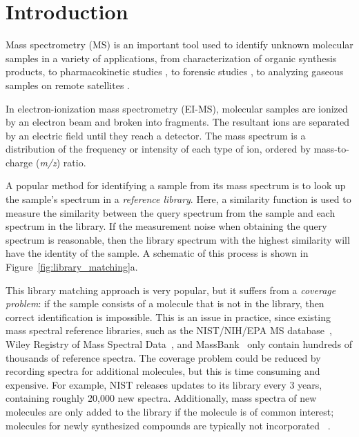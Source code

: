 \section{Introduction}

Mass spectrometry (MS) is an important tool used to identify unknown molecular samples in a variety of applications, from characterization of organic synthesis products, to pharmacokinetic studies \cite{massspec_pharmakinetics}, to forensic studies \cite{Zhou2017LatentFingerprints}, to analyzing gaseous samples on remote satellites \cite{Petrie_ions_in_space}.

In electron-ionization mass spectrometry (EI-MS), molecular samples are ionized by an electron beam and broken into fragments. The resultant ions are separated by an electric field until they reach a detector. The mass spectrum is a distribution of the frequency or intensity of each type of ion, ordered by mass-to-charge (\textit{m/z}) ratio.

A popular method for identifying a sample from its mass spectrum is to look up the sample's spectrum in a \textit{reference library}. Here, a similarity function is used to measure the similarity between the query spectrum from the sample and each spectrum in the library. If the measurement noise when obtaining the query spectrum is reasonable, then the library spectrum with the highest similarity will have the identity of the sample.\cite{stein1995ChemicalSubstructureIdentification,stein1994optimization} A schematic of this process is shown in Figure~\ref{fig:library_matching}a.

This library matching approach is very popular, but it suffers from a \textit{coverage problem}: if the sample consists of a molecule that is not in the library, then correct identification is impossible. This is an issue in practice, since existing mass spectral reference libraries, such as the NIST/NIH/EPA MS database~\cite{2017nist}, Wiley Registry of Mass Spectral Data~\cite{mclafferty2016wiley}, and MassBank~\cite{horai2010massbank} only contain hundreds of thousands of reference spectra. The coverage problem could be reduced by recording spectra for additional molecules, but this is time consuming and expensive. For example, NIST releases updates to its library every 3 years, containing roughly 20,000 new spectra. Additionally, mass spectra of new molecules are only added to the library if the molecule is of common interest; molecules for newly synthesized compounds are typically not incorporated~ \cite{2017nist,stein2012MassLibReview}.

